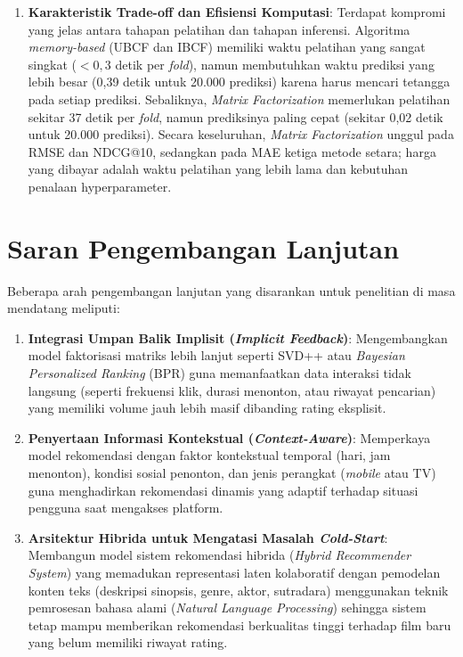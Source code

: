 \begin{enumerate}
    \item \textbf{Karakteristik Trade-off dan Efisiensi Komputasi}: Terdapat kompromi yang jelas antara tahapan pelatihan dan tahapan inferensi. Algoritma \textit{memory-based} (UBCF dan IBCF) memiliki waktu pelatihan yang sangat singkat ($< 0,3$ detik per \textit{fold}), namun membutuhkan waktu prediksi yang lebih besar (0,39 detik untuk 20.000 prediksi) karena harus mencari tetangga pada setiap prediksi. Sebaliknya, \textit{Matrix Factorization} memerlukan pelatihan sekitar 37 detik per \textit{fold}, namun prediksinya paling cepat (sekitar 0,02 detik untuk 20.000 prediksi). Secara keseluruhan, \textit{Matrix Factorization} unggul pada RMSE dan NDCG@10, sedangkan pada MAE ketiga metode setara; harga yang dibayar adalah waktu pelatihan yang lebih lama dan kebutuhan penalaan hyperparameter.
\end{enumerate}

\section{Saran Pengembangan Lanjutan}
Beberapa arah pengembangan lanjutan yang disarankan untuk penelitian di masa mendatang meliputi:
\begin{enumerate}
    \item \textbf{Integrasi Umpan Balik Implisit (\textit{Implicit Feedback})}: Mengembangkan model faktorisasi matriks lebih lanjut seperti SVD++ atau \textit{Bayesian Personalized Ranking} (BPR) guna memanfaatkan data interaksi tidak langsung (seperti frekuensi klik, durasi menonton, atau riwayat pencarian) yang memiliki volume jauh lebih masif dibanding rating eksplisit.
    \item \textbf{Penyertaan Informasi Kontekstual (\textit{Context-Aware})}: Memperkaya model rekomendasi dengan faktor kontekstual temporal (hari, jam menonton), kondisi sosial penonton, dan jenis perangkat (\textit{mobile} atau TV) guna menghadirkan rekomendasi dinamis yang adaptif terhadap situasi pengguna saat mengakses platform.
    \item \textbf{Arsitektur Hibrida untuk Mengatasi Masalah \textit{Cold-Start}}: Membangun model sistem rekomendasi hibrida (\textit{Hybrid Recommender System}) yang memadukan representasi laten kolaboratif dengan pemodelan konten teks (deskripsi sinopsis, genre, aktor, sutradara) menggunakan teknik pemrosesan bahasa alami (\textit{Natural Language Processing}) sehingga sistem tetap mampu memberikan rekomendasi berkualitas tinggi terhadap film baru yang belum memiliki riwayat rating.
\end{enumerate}
